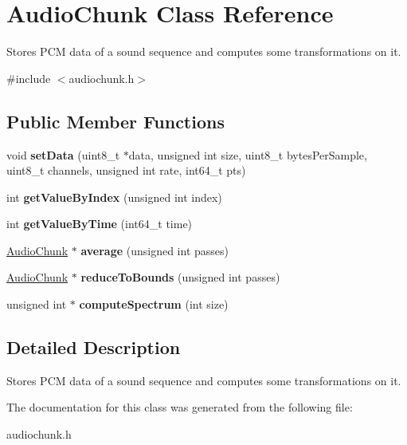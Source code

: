 \hypertarget{classAudioChunk}{
\section{AudioChunk Class Reference}
\label{classAudioChunk}
}


Stores PCM data of a sound sequence and computes some transformations on it.  




{\ttfamily \#include $<$audiochunk.h$>$}

\subsection*{Public Member Functions}
\begin{DoxyCompactItemize}
\item 
\hypertarget{classAudioChunk_ae1ab7fe968df97e0d69dedc5bcfb42d8}{
void {\bfseries setData} (uint8\_\-t $\ast$data, unsigned int size, uint8\_\-t bytesPerSample, uint8\_\-t channels, unsigned int rate, int64\_\-t pts)}
\label{classAudioChunk_ae1ab7fe968df97e0d69dedc5bcfb42d8}

\item 
\hypertarget{classAudioChunk_adf6e18214705cee819086637d9ecd9ce}{
int {\bfseries getValueByIndex} (unsigned int index)}
\label{classAudioChunk_adf6e18214705cee819086637d9ecd9ce}

\item 
\hypertarget{classAudioChunk_a6b9182b7c44ee9b1f3922f42bcdb66c0}{
int {\bfseries getValueByTime} (int64\_\-t time)}
\label{classAudioChunk_a6b9182b7c44ee9b1f3922f42bcdb66c0}

\item 
\hypertarget{classAudioChunk_a29273f809c520ce781157c95fa5ee119}{
\hyperlink{classAudioChunk}{AudioChunk} $\ast$ {\bfseries average} (unsigned int passes)}
\label{classAudioChunk_a29273f809c520ce781157c95fa5ee119}

\item 
\hypertarget{classAudioChunk_a84c44c1eb60e8dc09c45026cbb7c8739}{
\hyperlink{classAudioChunk}{AudioChunk} $\ast$ {\bfseries reduceToBounds} (unsigned int passes)}
\label{classAudioChunk_a84c44c1eb60e8dc09c45026cbb7c8739}

\item 
\hypertarget{classAudioChunk_a25fdf22f685b5ad78c4560b7a69c0e1f}{
unsigned int $\ast$ {\bfseries computeSpectrum} (int size)}
\label{classAudioChunk_a25fdf22f685b5ad78c4560b7a69c0e1f}

\end{DoxyCompactItemize}


\subsection{Detailed Description}
Stores PCM data of a sound sequence and computes some transformations on it. 

The documentation for this class was generated from the following file:\begin{DoxyCompactItemize}
\item 
audiochunk.h\end{DoxyCompactItemize}
